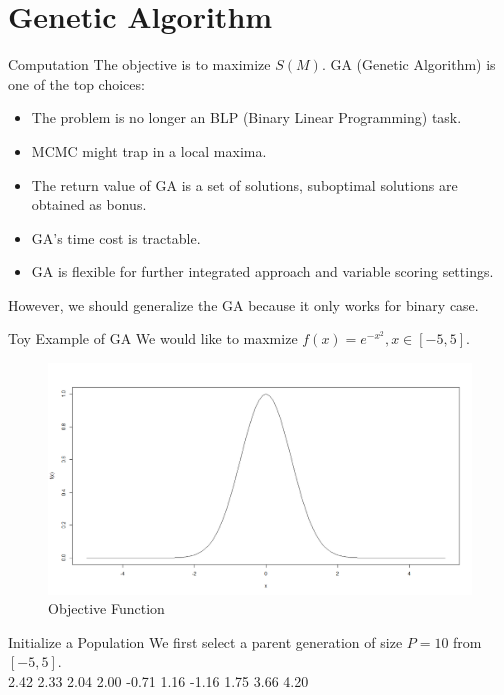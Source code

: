 \documentclass[xcolor=dvipsnames]{beamer}
\begin{document}
\section{Genetic Algorithm}
\begin{frame}{Computation}
The objective is to maximize $S(M)$. GA (Genetic Algorithm) is one of the top choices:\\
\begin{itemize}
\item The problem is no longer an BLP (Binary Linear Programming) task.\\
\item MCMC might trap in a local maxima.\\
\item The return value of GA is a set of solutions, suboptimal solutions are obtained as bonus.\\
\item GA's time cost is tractable.\\
\item GA is flexible for further integrated approach and variable scoring settings.\\
\end{itemize}
However, we should generalize the GA because it only works for binary case.\\
\end{frame}
\begin{frame}{Toy Example of GA}
We would like to maxmize $f(x)=e^{-x^2}, x\in[-5,5]$.\\
\begin{figure}
\includegraphics[width=0.9\linewidth]{toyfunction.png}
\caption{Objective Function}
\end{figure}
\end{frame}
\begin{frame}{Initialize a Population}
We first select a parent generation of size $P=10$ from $[-5,5]$.\\
2.42  2.33  2.04  2.00 -0.71  1.16 -1.16  1.75  3.66  4.20\\
\end{frame}
\end{document}
